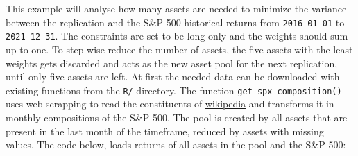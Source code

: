 \documentclass[
  oneside]{book}
\newenvironment{Shaded}{\begin{snugshade}}{\end{snugshade}}
\newcommand{\AttributeTok}[1]{\textcolor[rgb]{0.77,0.63,0.00}{#1}}
\newcommand{\DecValTok}[1]{\textcolor[rgb]{0.00,0.00,0.81}{#1}}
\newcommand{\FunctionTok}[1]{\textcolor[rgb]{0.00,0.00,0.00}{#1}}
\newcommand{\NormalTok}[1]{#1}
\newcommand{\OtherTok}[1]{\textcolor[rgb]{0.56,0.35,0.01}{#1}}
\newcommand{\SpecialCharTok}[1]{\textcolor[rgb]{0.00,0.00,0.00}{#1}}
\newcommand{\StringTok}[1]{\textcolor[rgb]{0.31,0.60,0.02}{#1}}
\begin{document}
This example will analyse how many assets are needed to minimize the variance between the replication and the S\&P 500 historical returns from \texttt{2016-01-01} to \texttt{2021-12-31}. The constraints are set to be long only and the weights should sum up to one. To step-wise reduce the number of assets, the five assets with the least weights gets discarded and acts as the new asset pool for the next replication, until only five assets are left. At first the needed data can be downloaded with existing functions from the \texttt{R/} directory. The function \texttt{get\_spx\_composition()} uses web scrapping to read the constituents of \href{https://en.wikipedia.org/wiki/List_of_S\%26P_500_companies}{wikipedia} and transforms it in monthly compositions of the S\&P 500. The pool is created by all assets that are present in the last month of the timeframe, reduced by assets with missing values. The code below, loads returns of all assets in the pool and the S\&P 500:

\begin{Shaded}
\end{Shaded}
\end{document}
